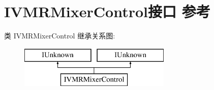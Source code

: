 \hypertarget{interface_i_v_m_r_mixer_control}{}\section{I\+V\+M\+R\+Mixer\+Control接口 参考}
\label{interface_i_v_m_r_mixer_control}
类 I\+V\+M\+R\+Mixer\+Control 继承关系图\+:\begin{figure}[H]
\begin{center}
\leavevmode
\includegraphics[height=2.000000cm]{interface_i_v_m_r_mixer_control}
\end{center}
\end{figure}
